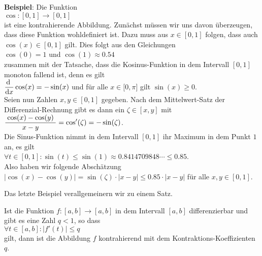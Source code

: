 \noindent
\textbf{Beispiel}: Die Funktion
\\[0.2cm]
\hspace*{1.3cm}
$\cos:[0,1] \rightarrow [0,1]$
\\[0.2cm]
ist eine kontrahierende Abbildung.  
Zun\"achst m\"ussen wir uns davon \"uberzeugen, dass diese Funktion wohldefiniert ist.
Dazu muss aus $x\in[0,1]$ folgen, dass auch $\cos(x) \in [0,1]$ gilt.  Dies folgt aus den
Gleichungen
\\[0.2cm]
\hspace*{1.3cm}
$\cos(0) = 1$ \quad und \quad $\cos(1) \approx 0.54$ 
\\[0.2cm]
zusammen mit der Tatsache, dass die Kosinus-Funktion in dem Intervall
$[0,1]$ monoton fallend ist, denn es gilt
\\[0.2cm]
\hspace*{1.3cm}
 $\displaystyle\frac{\textrm{d}\;}{\textrm{d}x} \cos(x) = -\sin(x)$  \quad und f\"ur alle $x \in \bigl[0,\pi\bigr]$ gilt $\sin(x) \geq 0$.
\\[0.2cm]
 Seien nun Zahlen $x,y\in[0,1]$ gegeben. 
Nach dem Mittelwert-Satz der Differenzial-Rechnung gibt es dann ein $\zeta\in[x,y]$ mit 
\\[0.2cm]
\hspace*{1.3cm} $\displaystyle\frac{\;\displaystyle\cos(x) - \cos(y)\;}{\;\displaystyle x - y\;} = \cos'(\zeta) = - \sin(\zeta)$.
\\[0.2cm]
Die Sinus-Funktion nimmt in dem Intervall $[0,1]$ ihr Maximum in dem Punkt $1$ an, es gilt
\\[0.2cm]
\hspace*{1.3cm} $\forall t \in [0,1]: \sin(t) \leq \sin(1) \approx 0.8414709848\cdots \leq 0.85$.
\\[0.2cm]
Also haben wir folgende Absch\"atzung
\\[0.2cm]
\hspace*{1.3cm}
$|\cos(x) - \cos(y)| = \sin(\zeta) \cdot  |x - y| \leq 0.85 \cdot  |x - y|$ \quad f\"ur alle $x,y\in[0,1]$.
\eox
\vspace*{0.2cm}

\noindent
Das letzte Beispiel verallgemeinern wir zu einem Satz.

\begin{Satz}
Ist die Funktion $f:[a,b] \rightarrow [a,b]$ in dem Intervall $[a,b]$ differenzierbar und gibt es eine Zahl
$q < 1$, so dass
\\[0.2cm]
\hspace*{1.3cm}
$\forall t \in [a,b]: |f'(t)| \leq q$
\\[0.2cm]
gilt, dann ist die Abbildung $f$ kontrahierend mit dem Kontraktions-Koeffizienten $q$.
\end{Satz}

